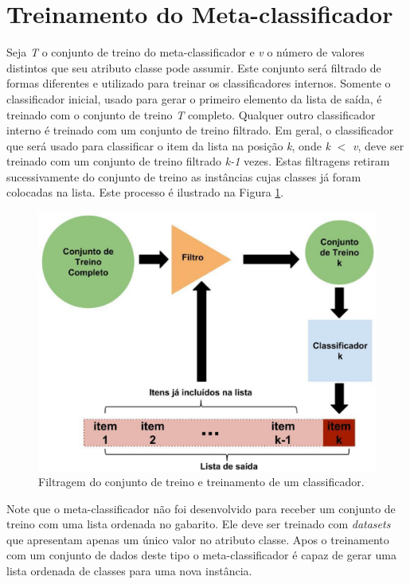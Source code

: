 \section{Treinamento do Meta-classificador}

Seja \textit{T} o conjunto de treino do meta-classificador e \textit{v} o número de valores distintos que seu atributo classe pode assumir. Este conjunto será filtrado de formas diferentes e utilizado para treinar os classificadores internos. Somente o classificador inicial, usado para gerar o primeiro elemento da lista de saída, é treinado com o conjunto de treino \textit{T} completo. Qualquer outro classificador interno é treinado com um conjunto de treino filtrado. Em geral, o classificador que será usado para classificar o item da lista na posição \textit{k}, onde \textit{k} $<$ \textit{v}, deve ser treinado com um conjunto de treino filtrado \textit{k-1} vezes. Estas filtragens retiram sucessivamente do conjunto de treino as instâncias cujas classes já foram colocadas na lista. Este processo é ilustrado na Figura \ref{fig:metodoproposto02}.

\begin{figure}[h!]
  \includegraphics[width=\linewidth]{images/metodoproposto02.eps}
  \caption{Filtragem do conjunto de treino e treinamento de um classificador.}
  \label{fig:metodoproposto02}
\end{figure}


Note que o meta-classificador não foi desenvolvido para receber um conjunto de treino com uma lista ordenada no gabarito. 
Ele deve ser treinado com \textit{datasets} que apresentam apenas um único valor no atributo classe.
Apos o treinamento com um conjunto de dados deste tipo o meta-classificador é capaz de gerar uma lista ordenada de classes para uma nova instância.

